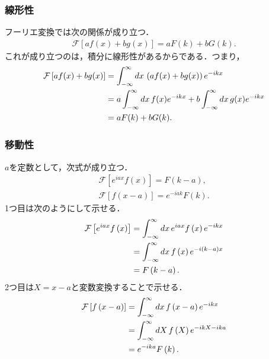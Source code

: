 \subsubsection{線形性}
フーリエ変換では次の関係が成り立つ．
\begin{align}
 \mathcal{F}\left[af\left(x\right) + bg\left(x\right)\right] = aF\left(k\right) + bG\left(k\right).
\end{align}
これが成り立つのは，積分に線形性があるからである．つまり，
\begin{align}
 \mathcal{F}\left[af(x) + b g(x)\right] 
   &= \int_{-\infty}^{\infty}dx\,\left(af(x)+bg(x)\right)e^{-ikx} \notag \\
   &= a\int_{-\infty}^{\infty}dx\,f(x)e^{-ikx} + b\int_{-\infty}^{\infty}dx\,g(x)e^{-ikx} \notag \\
   &= aF(k) + bG(k).
\end{align}
%
%
\subsubsection{移動性}
%
$a$を定数として，次式が成り立つ．
%
\begin{align}
 \mathcal{F}\left[e^{iax}f\left(x\right)\right] = F\left(k-a\right), \\
 \mathcal{F}\left[f\left(x-a\right)\right]      = e^{-iak}F\left(k\right). 
\end{align}
%
1つ目は次のようにして示せる．
\begin{align}
 \mathcal{F}\left[e^{iax}f\left(x\right)\right] 
 &=\int_{-\infty}^{\infty}dx\,e^{iax}f\left(x\right)e^{-ikx} \notag \\
 &=\int_{-\infty}^{\infty}dx\,f\left(x\right)e^{-i\left(k-a\right)x} \notag \\
 &=F\left(k-a\right). 
\end{align}
2つ目は$X=x-a$と変数変換することで示せる．
\begin{align}
 \mathcal{F}\left[f\left(x-a\right)\right]      
 &= \int_{-\infty}^{\infty}dx\,f\left(x-a\right)e^{-ikx} \notag \\
 &= \int_{-\infty}^{\infty}dX\,f\left(X\right)e^{-ikX-ika} \notag \\
 &= e^{-ika}F\left(k\right).
\end{align}
%
